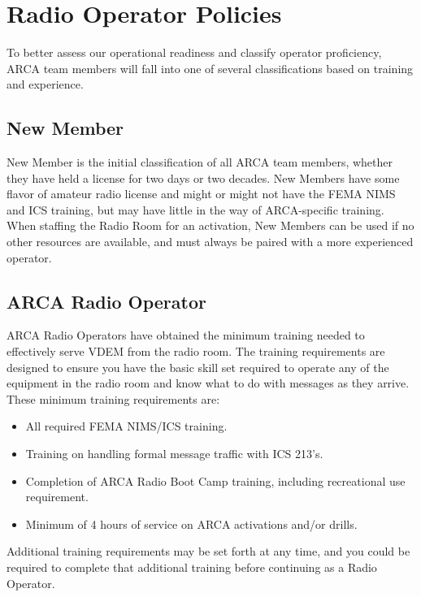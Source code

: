 \documentclass[pdflatex,letterpaper,twoside,12pt]{book}
\begin{document}

\section{Radio Operator Policies}

To better assess our operational readiness and classify operator proficiency, ARCA team members will fall into one of several classifications based on training and experience.

\subsection{New Member}

New Member is the initial classification of all ARCA team members, whether they have held a license for two days or two decades.  New Members have some flavor of amateur radio license and might or might not have the FEMA NIMS and ICS training, but may have little in the way of ARCA-specific training.  When staffing the Radio Room for an activation, New Members can be used if no other resources are available, and must always be paired with a more experienced operator.

\subsection{ARCA Radio Operator}

ARCA Radio Operators have obtained the minimum training needed to effectively serve VDEM from the radio room.  The training requirements are designed to ensure you have the basic skill set required to operate any of the equipment in the radio room and know what to do with messages as they arrive.  These minimum training requirements are:

\begin{itemize}
	\item All required FEMA NIMS/ICS training.
	\item Training on handling formal message traffic with ICS 213's.
	\item Completion of ARCA Radio Boot Camp training, including recreational use requirement.
	\item Minimum of 4 hours of service on ARCA activations and/or drills.
\end{itemize}

Additional training requirements may be set forth at any time, and you could be required to complete that additional training before continuing as a Radio Operator.
\end{document}
